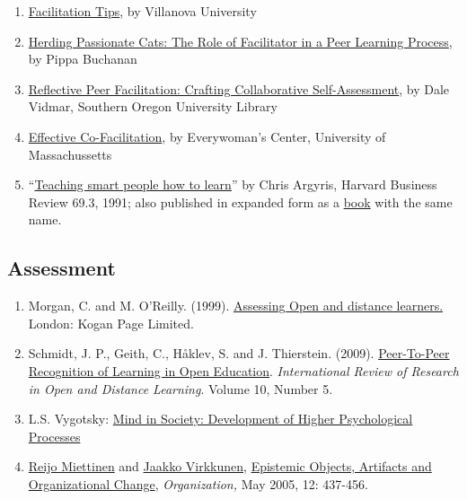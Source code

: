 \begin{enumerate}
{  and Facilitating Peer Support Groups}, by The Community Tool Box
\item
  \href{http://www1.villanova.edu/content/villanova/artsci/vcle/resources/toolkit/_jcr_content/pagecontent/download_8/file.res/FacilitationTips.doc}{Facilitation
  Tips}, by Villanova University
\item
  \href{http://pippabuchanan.com/2011/09/04/herding-passionate-cats-the-role-of-facilitator-in-a-peer-learning-process/}{Herding
  Passionate Cats: The Role of Facilitator in a Peer Learning Process},
  by Pippa Buchanan
\item
  \href{http://webpages.sou.edu/~vidmar/SOARS2008/vidmar.ppt}{Reflective
  Peer Facilitation: Crafting Collaborative Self-Assessment}, by Dale
  Vidmar, Southern Oregon University Library
\item
  \href{http://www.umass.edu/ewc/ea/Facilitation\%20Skills/important\%20tips.doc}{Effective
  Co-Facilitation}, by Everywoman's Center, University of Massachussetts
\item
  ``\href{www.ncsu.edu/park_scholarships/pdf/chris_argyris_learning.pdf?}{Teaching
  smart people how to learn}'' by Chris Argyris, Harvard Business Review
  69.3, 1991; also published in expanded form as a
  \href{http://www.amazon.com/Teaching-People-Harvard-Business-Classics/dp/1422126005}{book}
  with the same name.
\end{enumerate}

\subsection{Assessment}\label{rec:assessment}

\begin{enumerate}
\def\labelenumi{\arabic{enumi}.}
\item
  Morgan, C. and M. O'Reilly. (1999).
  \href{http://www.amazon.com/Assessing-Distance-Learners-Flexible-Learning/dp/0749428783/ref=tmm_pap_title_0?ie=UTF8\&qid=1388199564\&sr=1-1}{Assessing
  Open and distance learners.} London: Kogan Page Limited.
\item
  Schmidt, J. P., Geith, C., Håklev, S. and J. Thierstein. (2009).
  \href{http://www.irrodl.org/index.php/irrodl/article/view/641/1389}{Peer-To-Peer
  Recognition of Learning in Open Education}. \emph{International Review
  of Research in Open and Distance Learning}. Volume 10, Number 5.
\item
  L.S. Vygotsky:
  \href{http://books.google.com/books?id=RxjjUefze_oC\&printsec=frontcover\&source=gbs_atb\#v=onepage\&q\&f=false}{Mind
  in Society: Development of Higher Psychological Processes}
\item
  \href{http://org.sagepub.com/search?author1=Reijo+Miettinen\&sortspec=date\&submit=Submit}{Reijo
  Miettinen} and
  \href{http://org.sagepub.com/search?author1=Jaakko+Virkkunen\&sortspec=date\&submit=Submit}{Jaakko
  Virkkunen},
  \href{http://org.sagepub.com/content/12/3/437.abstract}{Epistemic
  Objects, Artifacts and Organizational Change}, \emph{Organization,}
  May 2005, 12: 437-456.
\end{enumerate}

